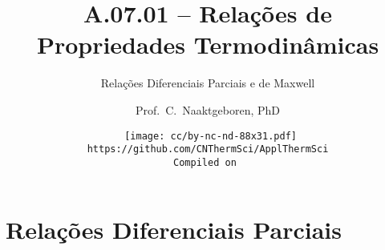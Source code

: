 \makeatletter
\immediate{} %
\makeatother



\title{A.07.01 -- Relações de Propriedades Termodinâmicas}
\subtitle{Relações Diferenciais Parciais e de Maxwell}
\author{Prof.~C.~Naaktgeboren, PhD}
\date{{\scriptsize\tt%
    \texttt{[image: cc/by-nc-nd-88x31.pdf]}\\[\smallskipamount]
    https://github.com/CNThermSci/ApplThermSci\\
    Compiled on 
}}

\frame{\titlepage}

\frame{\tableofcontents}

\section{Relações Diferenciais Parciais}

